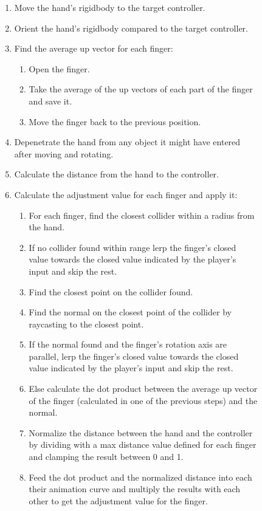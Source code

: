 \begin{figure}[H]
\centering
\small
\begin{enumerate}[noitemsep]
\item Move the hand's rigidbody to the target controller.
\item Orient the hand's rigidbody compared to the target controller.
\item Find the average up vector for each finger:
\begin{enumerate}[noitemsep]
\item Open the finger.
\item Take the average of the up vectors of each part of the finger and save it.
\item Move the finger back to the previous position.
\end{enumerate}
\item Depenetrate the hand from any object it might have entered after moving and rotating.
\item Calculate the distance from the hand to the controller.
\item Calculate the adjustment value for each finger and apply it:
\begin{enumerate}[noitemsep]
\item For each finger, find the closest collider within a radius from the hand.
\item If no collider found within range lerp the finger's closed value towards the closed value indicated by the player's input and skip the rest.
\item Find the closest point on the collider found.
\item Find the normal on the closest point of the collider by raycasting to the closest point.
\item If the normal found and the finger's rotation axis are parallel, lerp the finger's closed value towards the closed value indicated by the player's input and skip the rest.
\item Else calculate the dot product between the average up vector of the finger (calculated in one of the previous steps) and the normal.
\item Normalize the distance between the hand and the controller by dividing with a max distance value defined for each finger and clamping the result between 0 and 1.
\item Feed the dot product and the normalized distance into each their animation curve and multiply the results with each other to get the adjustment value for the finger.

\end{enumerate}
\end{enumerate}
\end{figure}
